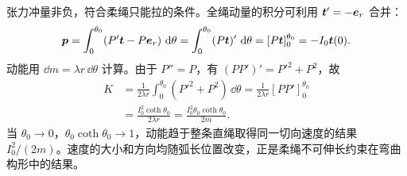 \begin{solution}
张力冲量非负，符合柔绳只能拉的条件。全绳动量的积分可利用 $\bm{t}'=-\bm{e}_r$ 合并：
\[
\bm{p}=\int_0^{\theta_0}(P'\bm{t}-P\bm{e}_r)\,\mathop{}\!\mathrm d\theta
=\int_0^{\theta_0}(P\bm{t})'\,\mathop{}\!\mathrm d\theta
=[P\bm{t}]_0^{\theta_0}=-I_0\bm{t}(0).
\]
动能用 $\dd m=\lambda r\,\dd\theta$ 计算。由于 $P''=P$，有 $(PP')'=P'^2+P^2$，故
\[
\begin{aligned}
K&=\frac1{2\lambda r}\int_0^{\theta_0}(P'^2+P^2)\,\dd\theta
=\frac1{2\lambda r}[PP']_0^{\theta_0}\\
&=\frac{I_0^2\coth\theta_0}{2\lambda r}
=\frac{I_0^2\theta_0\coth\theta_0}{2m}.
\end{aligned}
\]
当 $\theta_0\to0$，$\theta_0\coth\theta_0\to1$，动能趋于整条直绳取得同一切向速度的结果 $I_0^2/(2m)$。速度的大小和方向均随弧长位置改变，正是柔绳不可伸长约束在弯曲构形中的结果。


\end{solution}



